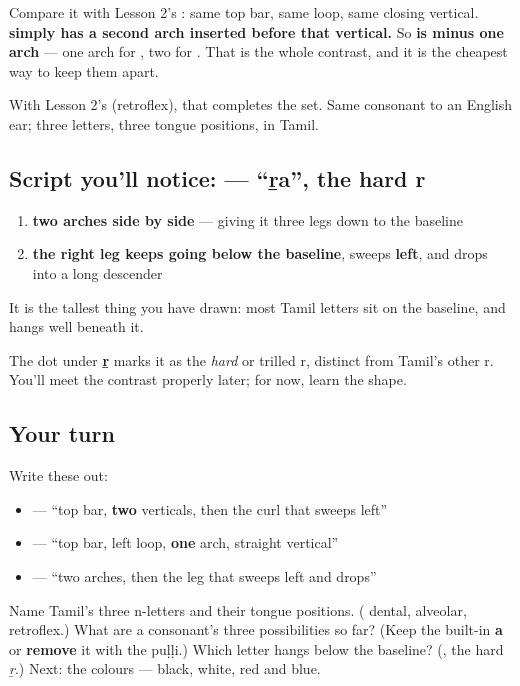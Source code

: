 Compare it with Lesson 2's \textbf{}: same top bar, same loop, same closing vertical. \textbf{ simply has a second arch inserted before that vertical.} So \textbf{ is  minus one arch} — one arch for , two for . That is the whole contrast, and it is the cheapest way to keep them apart.

With Lesson 2's \textbf{} (retroflex), that completes the set. Same consonant to an English ear; three letters, three tongue positions, in Tamil.

\subsection*{Script you'll notice:  — \textquotedblleft{}ṟa\textquotedblright{}, the hard r}
\begin{enumerate}
\raggedright
  \item \textbf{two arches side by side} — giving it three legs down to the baseline
  \item \textbf{the right leg keeps going below the baseline}, sweeps \textbf{left}, and drops into a long descender
\end{enumerate}

It is the tallest thing you have drawn: most Tamil letters sit on the baseline, and  hangs well beneath it.

The dot under \textbf{ṟ} marks it as the \emph{hard} or trilled r, distinct from Tamil's other r. You'll meet the contrast properly later; for now, learn the shape.

\subsection*{Your turn}
Write these out:

\begin{itemize}
\raggedright
  \item {} — \textquotedblleft{}top bar, \textbf{two} verticals, then the curl that sweeps left\textquotedblright{}
  \item {} — \textquotedblleft{}top bar, left loop, \textbf{one} arch, straight vertical\textquotedblright{}
  \item {} — \textquotedblleft{}two arches, then the leg that sweeps left and drops\textquotedblright{}
\end{itemize}

\begin{tcolorbox}[breakable,colback=teal!4,colframe=teal!35!black,title={Before you move on}]
Name Tamil's three n-letters and their tongue positions. (\textbf{} dental, \textbf{} alveolar, \textbf{} retroflex.) What are a consonant's three possibilities so far? (Keep the built-in \textbf{a} or \textbf{remove} it with the puḷḷi.) Which letter hangs below the baseline? (\textbf{}, the hard \emph{ṟ}.) Next: the colours — black, white, red and blue.
\end{tcolorbox}
